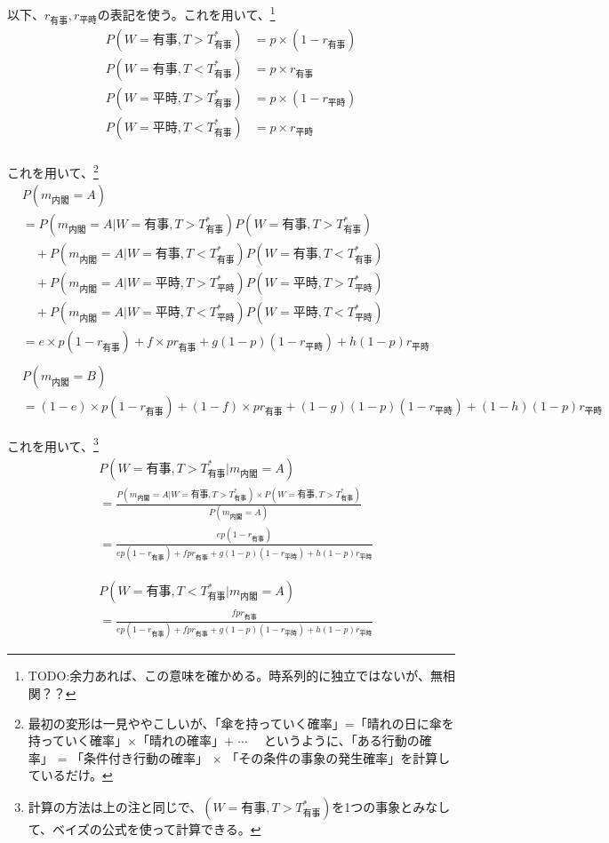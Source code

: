 \documentclass[main.tex]{subfiles}
\begin{document}
以下、$r_{有事}, r_{平時}$の表記を使う。これを用いて、\footnote{TODO:余力あれば、この意味を確かめる。時系列的に独立ではないが、無相関？？}
\begin{align*}
    P(W=有事, T>T^*_{有事}) &= p × (1-r_{有事})\\
    P(W=有事, T<T^*_{有事}) &= p × r_{有事}\\
    P(W=平時, T>T^*_{有事}) &= p × (1-r_{平時})\\
    P(W=平時, T<T^*_{有事}) &= p × r_{平時}\\
\end{align*}

これを用いて、\footnote{最初の変形は一見ややこしいが、「傘を持っていく確率」=「晴れの日に傘を持っていく確率」×「晴れの確率」+ $\cdots \quad$ 
というように、「ある行動の確率」 = 「条件付き行動の確率」 × 「その条件の事象の発生確率」を計算しているだけ。}
\begin{align*}
    & P(m_{内閣} = A) \\
    &=  P(m_{内閣} = A | W=有事, T>T^*_{有事})P(W=有事, T>T^*_{有事}) \\
    &\quad + P(m_{内閣} = A | W=有事, T<T^*_{有事})P(W=有事, T<T^*_{有事})\\
    &\quad + P(m_{内閣} = A | W=平時, T>T^*_{平時})P(W=平時, T>T^*_{平時})\\
    &\quad + P(m_{内閣} = A | W=平時, T<T^*_{平時})P(W=平時, T<T^*_{平時})\\
    &= e × p(1-r_{有事}) + f× pr_{有事} + g(1-p)(1-r_{平時}) + h(1-p)r_{平時}\\
    \\
    & P(m_{内閣} = B) \\
    &= (1-e) × p(1-r_{有事}) + (1-f)× pr_{有事} + (1-g)(1-p)(1-r_{平時}) + (1-h)(1-p)r_{平時}
\end{align*}

これを用いて、\footnote{計算の方法は上の注と同じで、$(W=有事, T>T^*_{有事})$を1つの事象とみなして、ベイズの公式を使って計算できる。}
\begin{align*}
    & P(W=有事, T>T^*_{有事} | m_{内閣}=A)\\[0.5em]
    &= \frac{ P(m_{内閣}=A| W={有事}, T>T^*_{有事}) × P(W={有事}, T>T^*_{有事}) }{ P(m_{内閣}=A) } \\[1em]
    &= \frac{ ep(1-r_{有事}) }{ ep(1-r_{有事}) + fpr_{有事} + g(1-p)(1-r_{平時}) + h(1-p)r_{平時} }
\end{align*}

\begin{align*}
    & P(W=有事, T<T^*_{有事} | m_{内閣}=A)\\[0.5em]
    &= \frac{ fpr_{有事} }{ ep(1-r_{有事}) + fpr_{有事} + g(1-p)(1-r_{平時}) + h(1-p)r_{平時} }
\end{align*}
\end{document}
